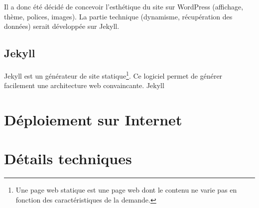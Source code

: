 Il a donc été décidé de concevoir l'esthétique du site sur WordPress (affichage, thème, polices, images). La partie technique (dynamisme, récupération des données) serait développée sur Jekyll.

\subsection{Jekyll}
Jekyll est un générateur de site statique\footnote{Une page web statique est une page web dont le contenu ne varie pas en fonction des caractéristiques de la demande.}. Ce logiciel permet de générer facilement une architecture web convaincante. Jekyll 

\section{Déploiement sur Internet}


\section{Détails techniques}